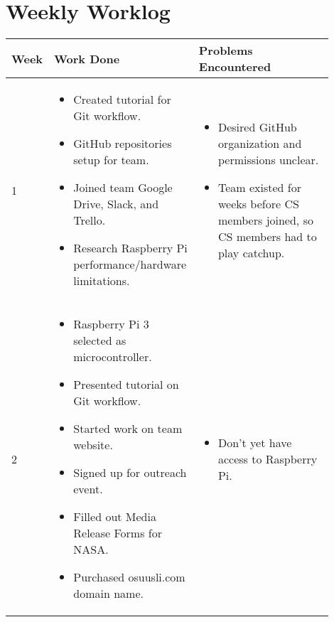 \documentclass[onecolumn, draftclsnofoot,10pt, compsoc]{IEEEtran}
\newenvironment{myitemize}
{ \begin{itemize}
    \setlength{\itemsep}{0pt}
    \setlength{\parskip}{0pt}
    \setlength{\parsep}{0pt}     }
{ \end{itemize}                  }
\begin{document}
\section{Weekly Worklog}
\begin{singlespacing}
\begin{tabular} {l p{0.45\linewidth} p{0.45\linewidth}} \textbf{Week} & \textbf{Work Done} & \textbf{Problems Encountered}\\\hline
1 &
\vspace{-\baselineskip}\begin{myitemize}
\item Created tutorial for Git workflow.
\item GitHub repositories setup for team.
\item Joined team Google Drive, Slack, and Trello.
\item Research Raspberry Pi performance/hardware limitations.
\vspace{-\baselineskip}\end{myitemize} & 
\vspace{-\baselineskip}\begin{myitemize}
\item Desired GitHub organization and permissions unclear.
\item Team existed for weeks before CS members joined, so CS members had to play catchup.
\vspace{-\baselineskip}\end{myitemize} \\\hline
2 &
\vspace{-\baselineskip}\begin{myitemize}
\item Raspberry Pi 3 selected as microcontroller.
\item Presented tutorial on Git workflow.
\item Started work on team website.
\item Signed up for outreach event.
\item Filled out Media Release Forms for NASA.
\item Purchased osuusli.com domain name.
\vspace{-\baselineskip}\end{myitemize} & 
\vspace{-\baselineskip}\begin{myitemize}
\item Don't yet have access to Raspberry Pi.
\vspace{-\baselineskip}\end{myitemize} \\\hline

\end{tabular}
\end{singlespacing}
\end{document}
